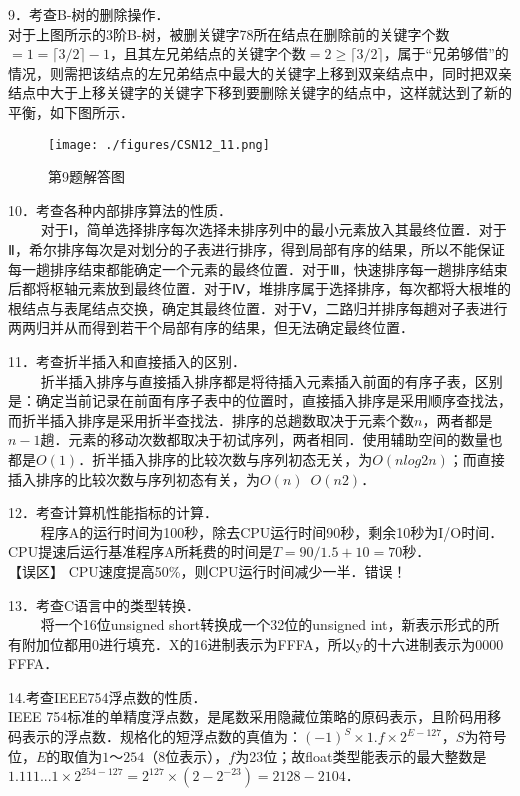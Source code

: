 9．考查B-树的删除操作．\\
对于上图所示的3阶B-树，被删关键字78所在结点在删除前的关键字个数$=1= \lceil 3/2 \rceil -1$，且其左兄弟结点的关键字个数$=2 \ge \lceil 3/2 \rceil $，属于“兄弟够借”的情况，则需把该结点的左兄弟结点中最大的关键字上移到双亲结点中，同时把双亲结点中大于上移关键字的关键字下移到要删除关键字的结点中，这样就达到了新的平衡，如下图所示．
\begin{figure}[ht]
\centering
\texttt{[image: ./figures/CSN12\_11.png]}
\caption{第9题解答图} \label{CSN12_fig11}
\end{figure}

10．考查各种内部排序算法的性质．\\
$\qquad$ 对于Ⅰ，简单选择排序每次选择未排序列中的最小元素放入其最终位置．对于Ⅱ，希尔排序每次是对划分的子表进行排序，得到局部有序的结果，所以不能保证每一趟排序结束都能确定一个元素的最终位置．对于Ⅲ，快速排序每一趟排序结束后都将枢轴元素放到最终位置．对于Ⅳ，堆排序属于选择排序，每次都将大根堆的根结点与表尾结点交换，确定其最终位置．对于Ⅴ，二路归并排序每趟对子表进行两两归并从而得到若干个局部有序的结果，但无法确定最终位置．

11．考查折半插入和直接插入的区别．\\
$\qquad$ 折半插入排序与直接插入排序都是将待插入元素插入前面的有序子表，区别是：确定当前记录在前面有序子表中的位置时，直接插入排序是采用顺序查找法，而折半插入排序是采用折半查找法．排序的总趟数取决于元素个数$n$，两者都是$n-1$趟．元素的移动次数都取决于初试序列，两者相同．使用辅助空间的数量也都是$O(1)$．折半插入排序的比较次数与序列初态无关，为$O(nlog2n)$；而直接插入排序的比较次数与序列初态有关，为$O(n)$~$O(n2)$．

12．考查计算机性能指标的计算．\\
$\qquad$ 程序A的运行时间为100秒，除去CPU运行时间90秒，剩余10秒为I/O时间．CPU提速后运行基准程序A所耗费的时间是$T=90/1.5+10=70$秒． \\
【误区】 CPU速度提高50\%，则CPU运行时间减少一半．错误！

13．考查C语言中的类型转换．\\
$\qquad$ 将一个16位unsigned short转换成一个32位的unsigned int，新表示形式的所有附加位都用0进行填充．X的16进制表示为FFFA，所以y的十六进制表示为0000 FFFA．

14.考查IEEE754浮点数的性质．\\
IEEE 754标准的单精度浮点数，是尾数采用隐藏位策略的原码表示，且阶码用移码表示的浮点数．规格化的短浮点数的真值为：$(-1)^S\times1.f\times2^{E-127}$，$S$为符号位，$E$的取值为$1$～$254$（$8$位表示），$f$为23位；故float类型能表示的最大整数是$1.111...1 \times 2^{254-127}=2^{127} \times (2-2^{-23})=2128-2104$．


